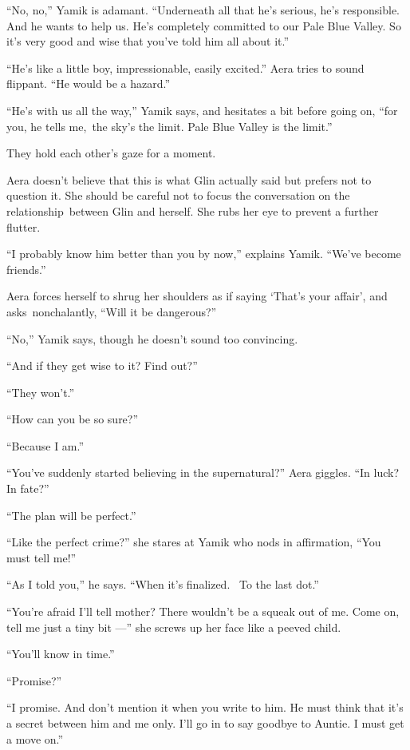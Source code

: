 \documentclass[twoside,11pt,openany]{book}
\begin{document}
``No, no,'' Yamik is adamant. ``Underneath all that he's serious, he's
responsible. And he wants to help us. He's completely committed to our Pale Blue Valley. So it's very good and wise
that you've told him all about it.''

``He's like a little boy, impressionable, easily excited.'' Aera tries to sound flippant.
``He would be a hazard.''

``He's with us all the way,'' Yamik says, and hesitates a bit before going
on,{ }``for you, he tells me,~the sky's the limit. Pale Blue Valley is the limit.''

They hold each other's gaze for a moment.

Aera doesn't believe that this is what Glin actually said but prefers not to question it. She should be careful not to
focus the conversation on the relationship~between Glin and herself. She rubs her eye to prevent a further flutter.

``I probably know him better than you by now,'' explains Yamik. ``We've become
friends.''

Aera forces herself to shrug her shoulders as if saying `That's your affair', and asks~nonchalantly, ``Will
it be dangerous?''

``No,'' Yamik says, though he doesn't sound too convincing.

``And if they get wise{ }to it? Find out?''

``They won't.''

``How can you be so sure?''

``Because I am.''

``You've suddenly started believing in the supernatural?'' Aera giggles. ``In
luck? In fate?''

``The plan will be perfect.''

``Like the perfect crime?'' she stares at Yamik who nods in affirmation, ``You must tell me!''


``As I told you,'' he says. ``When it's finalized.~ To the last dot.''

``You're afraid I'll tell mother? There wouldn't be a squeak out of me. Come on, tell me just a tiny bit ---'' she screws up her face like a peeved child.

``You'll know in time.''

``Promise?''

``I promise. And don't mention it when you write to him. He must think that it's a secret between him and
me only. I'll go in to say goodbye to Auntie. I must get a move on.''
\end{document}
